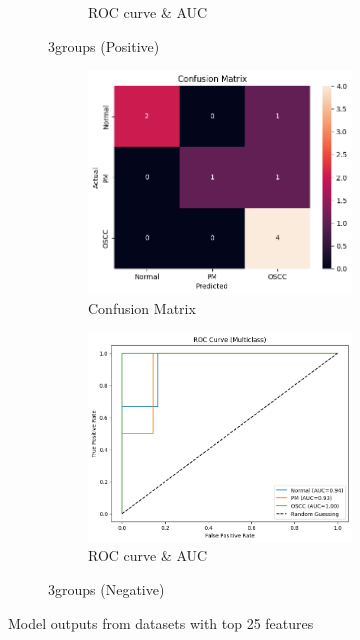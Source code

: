 \documentclass[a4paper,12pt]{article}
\begin{document}
\begin{figure}[H]
\begin{subfigure}[b]{0.45\textwidth}
\begin{subfigure}[b]{0.49\textwidth}
			\caption{ROC curve \& AUC}
			\label{fig:fig6}
		\end{subfigure}
		\caption{3groups (Positive)}
		\label{subfig:3}
	\end{subfigure}
	\hfill
	\begin{subfigure}[b]{0.45\textwidth}
		\centering
		\begin{subfigure}[b]{0.49\textwidth}
			\centering
			\includegraphics[width=\textwidth]{images/3lnc.png}  %
			\caption{Confusion Matrix}
			\label{fig:fig7}
		\end{subfigure}
		\hfill
		\begin{subfigure}[b]{0.49\textwidth}
			\centering
			\includegraphics[width=\textwidth]{images/3lnr.png}  %
			\caption{ROC curve \& AUC}
			\label{fig:fig8}
		\end{subfigure}
		\caption{3groups (Negative)}
		\label{subfig:4}
	\end{subfigure}

	\caption{Model outputs from datasets with top 25 features}
	\label{fig:grid}
\end{figure}
\end{document}
